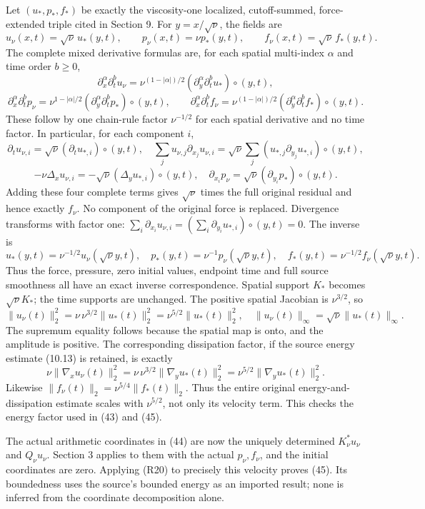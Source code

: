 Let \((u_*,p_*,f_*)\) be exactly the viscosity-one localized, cutoff-summed, force-extended triple cited in Section 9. For \(y=x/\sqrt\nu\), the fields are \[
u_\nu(x,t)=\sqrt\nu\,u_*(y,t),\qquad
p_\nu(x,t)=\nu p_*(y,t),\qquad
f_\nu(x,t)=\sqrt\nu\,f_*(y,t).
\tag{R22}
\] The complete mixed derivative formulas are, for each spatial multi-index \(\alpha\) and time order \(b\ge0\), \[
\partial_x^\alpha\partial_t^bu_\nu
=\nu^{(1-|\alpha|)/2}
(\partial_y^\alpha\partial_t^bu_*)\circ(y,t),
\] \[
\partial_x^\alpha\partial_t^bp_\nu
=\nu^{1-|\alpha|/2}
(\partial_y^\alpha\partial_t^bp_*)\circ(y,t),
\qquad
\partial_x^\alpha\partial_t^bf_\nu
=\nu^{(1-|\alpha|)/2}
(\partial_y^\alpha\partial_t^bf_*)\circ(y,t).
\tag{R23}
\] These follow by one chain-rule factor \(\nu^{-1/2}\) for each spatial derivative and no time factor. In particular, for each component \(i\), \[
\partial_tu_{\nu,i}=\sqrt\nu(\partial_tu_{*,i})\circ(y,t),
\quad
\sum_j u_{\nu,j}\partial_{x_j}u_{\nu,i}
=\sqrt\nu\sum_j(u_{*,j}\partial_{y_j}u_{*,i})\circ(y,t),
\] \[
-\nu\Delta_xu_{\nu,i}=-\sqrt\nu(\Delta_yu_{*,i})\circ(y,t),
\quad
\partial_{x_i}p_\nu=\sqrt\nu(\partial_{y_i}p_*)\circ(y,t).
\tag{R24}
\] Adding these four complete terms gives \(\sqrt\nu\) times the full original residual and hence exactly \(f_\nu\). No component of the original force is replaced. Divergence transforms with factor one: \(\sum_i\partial_{x_i}u_{\nu,i}=(\sum_i\partial_{y_i}u_{*,i})\circ(y,t)=0\). The inverse is \[
u_*(y,t)=\nu^{-1/2}u_\nu(\sqrt\nu y,t),\quad
p_*(y,t)=\nu^{-1}p_\nu(\sqrt\nu y,t),\quad
f_*(y,t)=\nu^{-1/2}f_\nu(\sqrt\nu y,t).
\tag{R25}
\] Thus the force, pressure, zero initial values, endpoint time and full source smoothness all have an exact inverse correspondence. Spatial support \(K_*\) becomes \(\sqrt\nu K_*\); the time supports are unchanged. The positive spatial Jacobian is \(\nu^{3/2}\), so \[
\|u_\nu(t)\|_2^2=\nu\,\nu^{3/2}\|u_*(t)\|_2^2
=\nu^{5/2}\|u_*(t)\|_2^2,
\quad \|u_\nu(t)\|_\infty=\sqrt\nu\|u_*(t)\|_\infty.
\tag{R26}
\] The supremum equality follows because the spatial map is onto, and the amplitude is positive. The corresponding dissipation factor, if the source energy estimate (10.13) is retained, is exactly \[
\nu\|\nabla_xu_\nu(t)\|_2^2
=\nu\,\nu^{3/2}\|\nabla_yu_*(t)\|_2^2
=\nu^{5/2}\|\nabla_yu_*(t)\|_2^2.
\] Likewise \(\|f_\nu(t)\|_2=\nu^{5/4}\|f_*(t)\|_2\). Thus the entire original energy-and-dissipation estimate scales with \(\nu^{5/2}\), not only its velocity term. This checks the energy factor used in (43) and (45).

The actual arithmetic coordinates in (44) are now the uniquely determined \(K_\nu^*u_\nu\) and \(Q_\nu u_\nu\). Section 3 applies to them with the actual \(p_\nu,f_\nu\), and the initial coordinates are zero. Applying (R20) to precisely this velocity proves (45). Its boundedness uses the source's bounded energy as an imported result; none is inferred from the coordinate decomposition alone.

